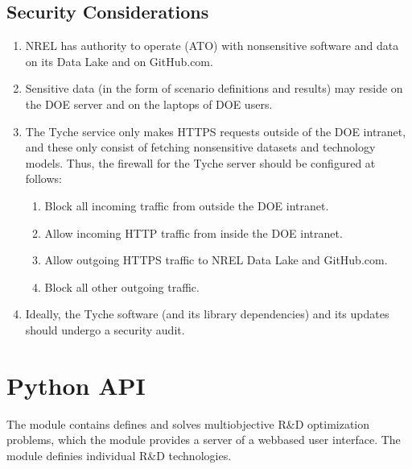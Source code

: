 \documentclass[letterpaper,10pt,english]{sphinxmanual}
\begin{document}
\section{Security Considerations}
\label{\detokenize{deployment:security-considerations}}\begin{enumerate}
%
\item {} 
\sphinxAtStartPar
NREL has authority to operate (ATO) with non\sphinxhyphen{}sensitive software and
data on its Data Lake and on GitHub.com.

\item {} 
\sphinxAtStartPar
Sensitive data (in the form of scenario definitions and results) may
reside on the DOE server and on the laptops of DOE users.

\item {} 
\sphinxAtStartPar
The Tyche service only makes HTTPS  requests outside of the
DOE intranet, and these only consist of fetching non\sphinxhyphen{}sensitive
datasets and technology models. Thus, the firewall for the Tyche
server should be configured at follows:
\begin{enumerate}
%
\item {} 
\sphinxAtStartPar
Block all incoming traffic from outside the DOE intranet.

\item {} 
\sphinxAtStartPar
Allow incoming HTTP traffic from inside the DOE intranet.

\item {} 
\sphinxAtStartPar
Allow outgoing HTTPS traffic to NREL Data Lake and GitHub.com.

\item {} 
\sphinxAtStartPar
Block all other outgoing traffic.

\end{enumerate}

\item {} 
\sphinxAtStartPar
Ideally, the Tyche software (and its library dependencies) and its
updates should undergo a security audit.

\end{enumerate}

\sphinxstepscope


\chapter{Python API}
\label{\detokenize{modules:python-api}}\label{\detokenize{modules:sec-modules}}\label{\detokenize{modules::doc}}
\sphinxAtStartPar
The module {\hyperref[\detokenize{tyche:module-tyche}]{}} contains defines and solves multi\sphinxhyphen{}objective R\&D
optimization problems, which the module  provides a server
of a web\sphinxhyphen{}based user interface. The module {\hyperref[\detokenize{technology:module-technology}]{}} definies
individual R\&D technologies.
\end{document}
